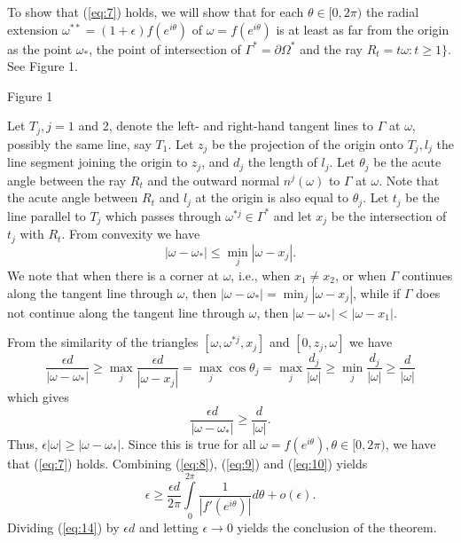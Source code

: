 To show that (\ref{eq:7}) holds, we will show that for each $\theta
\in [0, 2\pi)$ the radial extension $\omega^{\ast\ast}=(1+\epsilon)
f(e^{i\theta})$ of $\omega =f(e^{i\theta})$ is at least as far from
the origin as the point $\omega_\ast$, the point of intersection of
$\Gamma^\ast =\partial \Omega^\ast$ and the ray $R_t=t\omega: t\geq
1\}$.  See Figure 1.
\vspace*{6in}

\centerline{Figure 1}
\vspace{24pt}

\noindent Let $T_j, j=1$ and 2, denote the left- and
right-hand tangent lines to $\Gamma$ at $\omega$, possibly the same
line, say $T_1$.  Let $z_j$ be the projection of the origin onto
$T_j, l_j$ the line segment joining the origin to $z_j$, and $d_j$
the length of $l_j$.  Let $\theta_j$ be the acute angle between the
ray $R_t$ and the outward normal $n^j(\omega)$ to $\Gamma$ at
$\omega$.  Note that the acute angle between $R_t$ and $l_j$ at the
origin is also equal to $\theta_j$.  Let $t_j$ be the line parallel
to $T_j$ which passes through $\omega^{\ast j} \in \Gamma^\ast$ and
let $x_j$ be the intersection of $t_j$ with $R_t$.  From 
convexity we have
$$|\omega -\omega_\ast| \leq \min_j |\omega-x_j|.$$
We note that when there is a corner at $\omega$, i.e., when $x_1\neq
x_2$, or when $\Gamma$ continues along the tangent line through
$\omega$, then $|\omega-\omega_\ast|=\min_j|\omega-x_j|$, while if
$\Gamma$ does not continue along the tangent line through $\omega$,
then $|\omega-\omega_\ast|<|\omega -x_1|$.

From the similarity of the triangles $[\omega, \omega^{\ast j}, x_j]$
and $[0,z_j,\omega]$ we have
\begin{equation}
\label{eq:12}
\frac{\epsilon d}{|\omega-\omega_\ast|} \geq \max_j \frac{\epsilon
d}{|\omega-x_j|} =\max_j \cos \theta_j =\max_j \frac{d_j}{|\omega|}
\geq \min_j \frac{d_j}{|\omega|} \geq \frac{d}{|\omega|} 
\end{equation}
which gives
\begin{equation}
\label{eq:13}
\frac{\epsilon d}{|\omega-\omega_\ast|} \geq \frac{d}{|\omega|}.
\end{equation}
Thus, $\epsilon|\omega|\geq |\omega-\omega_\ast|$.  Since this is
true for all $\omega=f(e^{i\theta}), \theta \in [0, 2\pi)$, we have
that (\ref{eq:7}) holds.  Combining (\ref{eq:8}), (\ref{eq:9}) and
(\ref{eq:10}) yields
\begin{equation}
\label{eq:14}
\epsilon \geq \frac{\epsilon d}{2\pi} \int\limits^{2\pi}_0
\frac{1}{|f'(e^{i\theta})|} d\theta +o(\epsilon).
\end{equation}
Dividing (\ref{eq:14}) by $\epsilon d$ and letting $\epsilon
\rightarrow 0$ yields the conclusion of the theorem.

